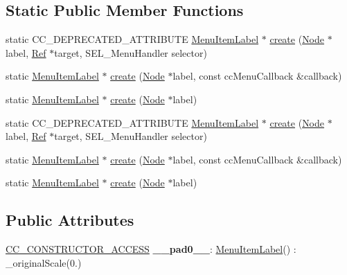 \subsection*{Static Public Member Functions}
\begin{DoxyCompactItemize}
\item 
static C\+C\+\_\+\+D\+E\+P\+R\+E\+C\+A\+T\+E\+D\+\_\+\+A\+T\+T\+R\+I\+B\+U\+TE \hyperlink{classMenuItemLabel}{Menu\+Item\+Label} $\ast$ \hyperlink{classMenuItemLabel_a982ea2eda2b4f99a2789df7f7b614582}{create} (\hyperlink{classNode}{Node} $\ast$label, \hyperlink{classRef}{Ref} $\ast$target, S\+E\+L\+\_\+\+Menu\+Handler selector)
\item 
static \hyperlink{classMenuItemLabel}{Menu\+Item\+Label} $\ast$ \hyperlink{classMenuItemLabel_a5d8418ae1c7adc97ebdee2c4a64187e5}{create} (\hyperlink{classNode}{Node} $\ast$label, const cc\+Menu\+Callback \&callback)
\item 
static \hyperlink{classMenuItemLabel}{Menu\+Item\+Label} $\ast$ \hyperlink{classMenuItemLabel_a1be806bb5fbf85dc8592713a740510ec}{create} (\hyperlink{classNode}{Node} $\ast$label)
\item 
static C\+C\+\_\+\+D\+E\+P\+R\+E\+C\+A\+T\+E\+D\+\_\+\+A\+T\+T\+R\+I\+B\+U\+TE \hyperlink{classMenuItemLabel}{Menu\+Item\+Label} $\ast$ \hyperlink{classMenuItemLabel_ab21e9750d0fd3af00e2984ad62eef902}{create} (\hyperlink{classNode}{Node} $\ast$label, \hyperlink{classRef}{Ref} $\ast$target, S\+E\+L\+\_\+\+Menu\+Handler selector)
\item 
static \hyperlink{classMenuItemLabel}{Menu\+Item\+Label} $\ast$ \hyperlink{classMenuItemLabel_aa344a5f65380e036ed835395930e02da}{create} (\hyperlink{classNode}{Node} $\ast$label, const cc\+Menu\+Callback \&callback)
\item 
static \hyperlink{classMenuItemLabel}{Menu\+Item\+Label} $\ast$ \hyperlink{classMenuItemLabel_a0ff1be86dd4cf669f0eeec17358ab7bd}{create} (\hyperlink{classNode}{Node} $\ast$label)
\end{DoxyCompactItemize}
\subsection*{Public Attributes}
\begin{DoxyCompactItemize}
\item 
\mbox{\label{classMenuItemLabel_ab1039fdc2df6c0882f9021d5e76ac3de}} 
\hyperlink{_2cocos2d_2cocos_2base_2ccConfig_8h_a25ef1314f97c35a2ed3d029b0ead6da0}{C\+C\+\_\+\+C\+O\+N\+S\+T\+R\+U\+C\+T\+O\+R\+\_\+\+A\+C\+C\+E\+SS} {\bfseries \+\_\+\+\_\+pad0\+\_\+\+\_\+}\+: \hyperlink{classMenuItemLabel}{Menu\+Item\+Label}() \+: \+\_\+original\+Scale(0.)
\end{DoxyCompactItemize}
